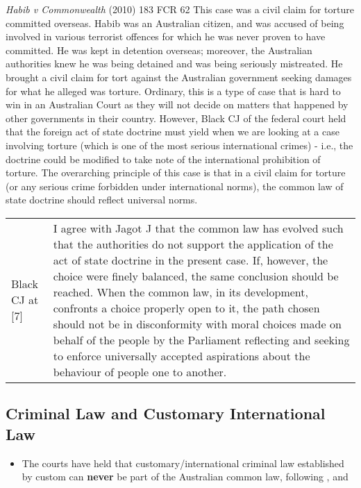 \begin{casedetails}{\textit{Habib v Commonwealth} (2010) 183 FCR 62}\label{case: Habib v Commonwealth}
    \flushleft
    This case was a civil claim for torture committed overseas. Habib was an Australian citizen, and was accused of being involved in various terrorist offences for which he was never proven to have committed. He was kept in detention overseas; moreover, the Australian authorities knew he was being detained and was being seriously mistreated. He brought a civil claim for tort against the Australian government seeking damages for what he alleged was torture. Ordinary, this is a type of case that is hard to win in an Australian Court as they will not decide on matters that happened by other governments in their country. However, Black CJ of the federal court held that the foreign act of state doctrine must yield when we are looking at a case involving torture (which is one of the most serious international crimes) - i.e., the doctrine could be modified to take note of the international prohibition of torture. The overarching principle of this case is that in a civil claim for torture (or any serious crime forbidden under international norms), the common law of state doctrine should reflect universal norms.

    \begin{longtable}{p{}|>{\raggedright\arraybackslash}p{}}
        Black CJ at [7] & I agree with Jagot J that the common law has evolved such that the authorities do not support the application of the act of state doctrine in the present case. If, however, the choice were finely balanced, the same conclusion should be reached. When the common law, in its development, confronts a choice properly open to it, the path chosen should not be in disconformity with moral choices made on behalf of the people by the Parliament reflecting and seeking to enforce universally accepted aspirations about the behaviour of people one to another.
    \end{longtable} 
\end{casedetails}

\subsection{Criminal Law and Customary International Law}
\begin{itemize}
    \item The courts have held that customary/international criminal law established by custom can \textbf{never} be part of the Australian common law, following , and 
\end{itemize}

